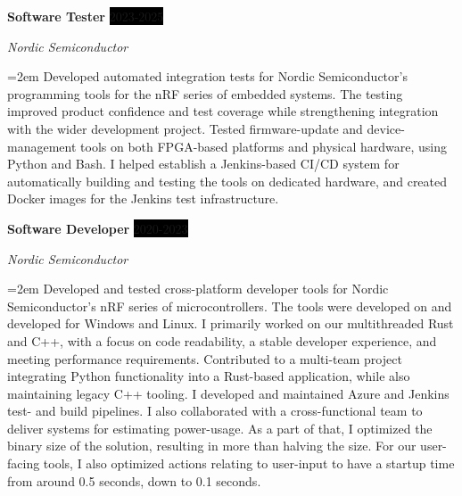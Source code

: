 \documentclass[paper=a4,fontsize=11pt,norsk]{scrartcl} %
\newcommand{\EducationEntry}[4]{
		\noindent \textbf{#1} \hfill      %
		\colorbox{Black}{%
			\parbox{6em}{%
			\hfill\color{White}#2}} \par  %
		\noindent \textit{#3} \par        %
		\noindent\hangindent=2em\hangafter=0 \small #4 %
		\normalsize \par}
\newcommand{\WorkEntry}[4]{				  %
		\noindent \textbf{#1} \hfill      %
		\colorbox{Black}{\color{White}#2} \par  %
		\noindent \textit{#3} \par              %
		\noindent\hangindent=2em\hangafter=0 \small #4 %
		\normalsize \par}
\begin{document}
\WorkEntry{Software Tester}{2023-2025}{Nordic Semiconductor}{Developed
automated integration tests for Nordic Semiconductor's programming tools for
the nRF series of embedded systems. The testing improved product confidence and
test coverage while strengthening integration with the wider development
project. Tested firmware-update and device-management tools on both FPGA-based
platforms and physical hardware, using Python and Bash. I helped establish a
Jenkins-based CI/CD system for automatically building and testing the tools on
dedicated hardware, and created Docker images for the Jenkins test
infrastructure.
}

\WorkEntry{Software Developer}{2020-2023}{Nordic Semiconductor}{Developed and
tested cross-platform developer tools for Nordic Semiconductor's nRF series of
microcontrollers. The tools were developed on and developed for Windows and
Linux. I primarily worked on our multithreaded Rust and C++, with a focus on
code readability, a stable developer experience, and meeting performance
requirements. Contributed to a multi-team project integrating Python
functionality into a Rust-based application, while also maintaining legacy C++
tooling. I developed and maintained Azure and Jenkins test- and build
pipelines. I also collaborated with a cross-functional team to deliver systems
for estimating power-usage. As a part of that, I optimized the binary size of
the solution, resulting in more than halving the size. For our user-facing
tools, I also optimized actions relating to user-input to have a startup time
from around 0.5 seconds, down to 0.1 seconds.
}



\end{document}
